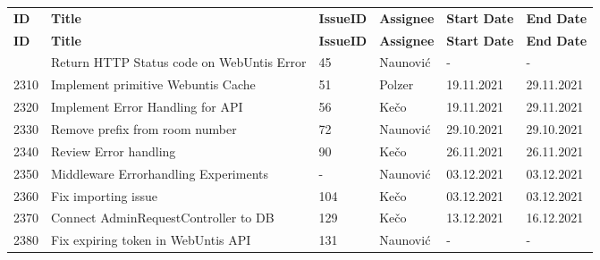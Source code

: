 \begin{longtable}{|p{}|p{}|p{}|p{}|p{}|p{}|} \hline
    \textbf{ID} & \textbf{Title} & \textbf{Issue\-ID} & \textbf{Assignee} & \textbf{Start Date} & \textbf{End \linebreak Date} \\ \hhline{|=|=|=|=|=|=|}
    \endfirsthead
    \hline
    \textbf{ID} & \textbf{Title} & \textbf{Issue\-ID} & \textbf{Assignee} & \textbf{Start Date} & \textbf{End \linebreak Date} \\ \hhline{|=|=|=|=|=|=|}
    \endhead
    2300 & Return HTTP Status code on WebUntis Error & 45 & Naunović & - & - \\ \hline
    2310 & Implement primitive Webuntis Cache & 51 & Polzer & 19.11.2021 & 29.11.2021 \\ \hline
    2320 & Implement Error Handling for API & 56 & Kečo & 19.11.2021 & 29.11.2021 \\ \hline
    2330 & Remove prefix from room number & 72 & Naunović & 29.10.2021 & 29.10.2021 \\ \hline
    2340 & Review Error handling & 90 & Kečo & 26.11.2021 & 26.11.2021 \\ \hline
    2350 & Middleware Errorhandling Experiments & - & Naunović & 03.12.2021 & 03.12.2021 \\ \hline
    2360 & Fix importing issue & 104 & Kečo & 03.12.2021 & 03.12.2021 \\ \hline
    2370 & Connect AdminRequestController to DB & 129 & Kečo & 13.12.2021 & 16.12.2021 \\ \hline
    2380 & Fix expiring token in WebUntis API & 131 & Naunović & - & - \\ \hline
\end{longtable}


